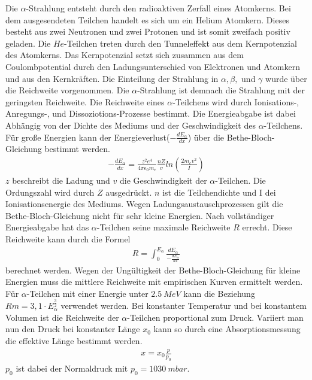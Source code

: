 Die $\alpha$-Strahlung entsteht durch den radioaktiven Zerfall eines Atomkerns. Bei dem ausgesendeten Teilchen handelt es sich um ein Helium Atomkern. Dieses besteht aus zwei Neutronen und zwei Protonen und ist somit zweifach positiv geladen.
Die $He$-Teilchen treten durch den Tunneleffekt aus dem Kernpotenzial des Atomkerns.
Das Kernpotenzial setzt sich zusammen aus dem Coulombpotential durch den Ladungsunterschied von Elektronen und Atomkern und aus den Kernkräften.
Die Einteilung der Strahlung in $\alpha, \beta,$ und $\gamma$ wurde über die Reichweite vorgenommen. Die $\alpha$-Strahlung ist demnach die Strahlung mit der geringsten Reichweite.
Die Reichweite eines $\alpha$-Teilchens wird durch Ionisations-, Anregungs-, und Dissoziotions-Prozesse bestimmt. Die Energieabgabe ist dabei Abhängig von der Dichte des Mediums und der Geschwindigkeit des $\alpha$-Teilchens.
Für große Energien kann der Energieverlust($-\frac{dE_{\alpha}}{dx}$) über die Bethe-Bloch-Gleichung bestimmt werden.
\begin{align*}
  -\frac{dE_{\alpha}}{dx}=\frac{z^2e^4}{4\pi\epsilon_0m_e}\frac{nZ}{v}ln\left(\frac{2m_ev^2}{I}\right)
\end{align*}
$z$ beschreibt die Ladung und $v$ die Geschwindigkeit der $\alpha$-Teilchen. Die Ordungszahl wird durch $Z$ ausgedrückt. $n$ ist die Teilchendichte und I dei Ionisationsenergie des Mediums.
Wegen Ladungsaustauschprozessen gilt die Bethe-Bloch-Gleichung nicht für sehr kleine Energien.
Nach vollständiger Energieabgabe hat das $\alpha$-Teilchen seine maximale Reichweite $R$ errecht. Diese Reichweite kann durch die Formel
\begin{align*}
  R=\int^{E_{\alpha}}_{0}\frac{dE_{\alpha}}{-\frac{dE_{\alpha}}{dx}}
\end{align*}
berechnet werden.
Wegen der Ungültigkeit der Bethe-Bloch-Gleichung für kleine Energien muss die mittlere Reichweite mit empirischen Kurven ermittelt werden.
Für $\alpha$-Teilchen mit einer Energie unter $\SI{2,5}{MeV}$ kann die Beziehung $Rm= 3,1 \cdot E_{\alpha}^{\frac{3}{2}}$ verwendet werden.
Bei konstanter Temperatur und bei konstantem Volumen ist die Reichweite der $\alpha$-Teilchen proportional zum Druck.
Variiert man nun den Druck bei konstanter Länge $x_0$ kann so durch eine Absorptionsmessung die effektive Länge bestimmt werden.
\begin{align}
  x=x_0\frac{p}{p_0}
  \label{eqn:x}
\end{align}
$p_0$ ist dabei der Normaldruck mit $p_0=\SI{1030}{mbar}$.
